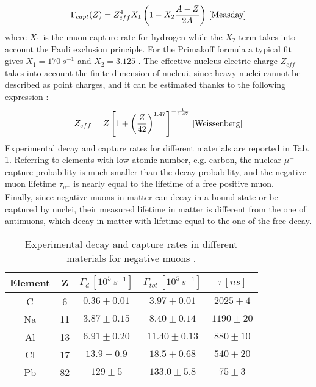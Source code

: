 \begin{equation}
	\Gamma_{capt}(Z) = Z_{eff}^4 X_1 \left( 1 - X_2 \frac{A - Z}{2A} \right)  \, \cite{Measday}
\end{equation}
where $X_1$ is the muon capture rate for hydrogen %
while the $X_2$ term takes into account the Pauli exclusion
principle.
For the Primakoff formula a typical fit gives $X_1 = \SI{170}{s^{-1}}$ and $X_2 =3.125$ \cite{Measday}.
The effective nucleus electric charge $Z_{eff}$ takes into account the finite dimension of nucleui, since heavy nuclei cannot be described as point charges, and it can be estimated thanks to the following expression \cite{Weissenberg}:
\begin{equation}
	Z_{eff} = Z \left[ 1 + \left( \frac{Z}{42} \right)^{1.47} \right]^{-\frac{1}{1.47}} \, \cite{Weissenberg}   
\end{equation}
Experimental decay and capture rates for different materials are reported in Tab. \ref{tabellina}.
Referring to elements with low atomic number, e.g. carbon, the nuclear $\mu^-$-capture probability is much smaller than the decay probability, and the negative-muon lifetime $\tau_{\mu^-}$ is nearly equal to the lifetime of a free positive muon.\\
Finally, since negative muons in matter can decay in a bound state or be captured by nuclei, their measured lifetime in matter is different from the one of antimuons, which decay in matter with lifetime equal to the one of the free decay.

\begin{table} 
	\centering
	\begin{tabular}{ccccc} 
		\toprule
		Element & Z & $\Gamma_{d} \, [10^5 \, \si{s^{-1}} ]$ & $\Gamma_{tot} \, [10^5 \, \si{s^{-1}} ]$ & $\tau \, [\si{ns}]$ \\
		\midrule
		C   & 6    & $0.36 \pm 0.01$ & $3.97 \pm 0.01$ \cite{sutton} & $2025 \pm 4$ \cite{sutton}\\
		Na   & 11    & $3.87 \pm 0.15$ & $8.40 \pm 0.14$ & $1190 \pm 20$\\
		Al   & 13 & $6.91 \pm 0.20$ & $11.40 \pm 0.13$ & $880 \pm 10$\\
		Cl   & 17 & $13.9 \pm 0.9$ & $18.5 \pm 0.68$ & $540 \pm 20$\\
		Pb   & 82 & $129 \pm 5$ & $133.0 \pm 5.8$ & $75 \pm 3 $\\
		\bottomrule
	\end{tabular} 
	\caption{Experimental decay and capture rates in different materials for negative muons \cite{Weissenberg}.}\label{tabellina}
\end{table}


